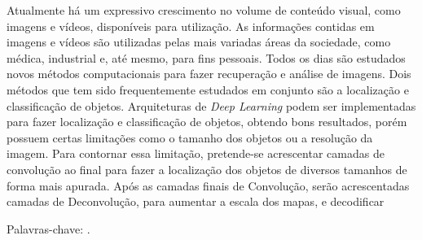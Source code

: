 \begin{resumo}
\vspace{-1cm}

\onehalfspacing

\noindent 
   Atualmente há um expressivo crescimento no volume de conteúdo visual, como imagens e vídeos, disponíveis para utilização. As informações contidas em imagens e vídeos são utilizadas pelas mais variadas áreas da sociedade, como médica, industrial e, até mesmo, para fins pessoais. Todos os dias são estudados novos métodos computacionais para fazer recuperação e análise de imagens. Dois métodos que tem sido frequentemente estudados em conjunto são a localização e classificação de objetos. Arquiteturas de \emph{Deep Learning} podem ser implementadas para fazer localização e classificação de objetos, obtendo bons resultados, porém possuem certas limitações como o tamanho dos objetos ou a resolução da imagem. Para contornar essa limitação, pretende-se acrescentar camadas de convolução ao final para fazer a localização dos objetos de diversos tamanhos de forma mais apurada. Após as camadas finais de Convolução, serão acrescentadas camadas de Deconvolução, para aumentar a escala dos mapas, e decodificar

\vspace*{.75cm}

\noindent Palavras-chave: .\\

\end{resumo}